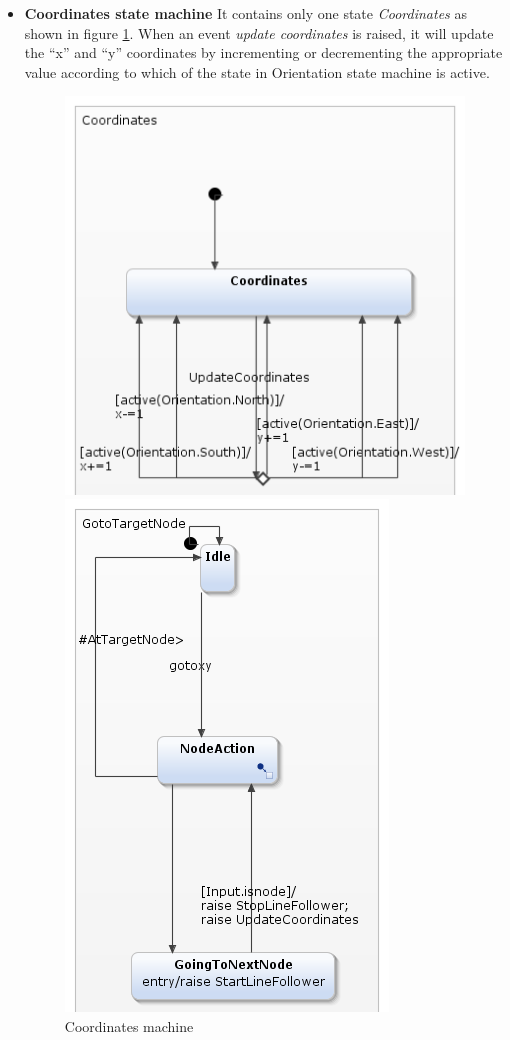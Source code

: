 \documentclass[a4paper,12pt,oneside]{book}
\begin{document}
\begin{itemize}
\item \textbf{Coordinates state machine}
It contains only one state \textit{Coordinates} as shown in figure \ref{coordinates}. When an event \textit{update coordinates} is raised, it will update the “x” and “y” coordinates by incrementing or decrementing the appropriate value according to which of the state in Orientation state machine is active.\pagebreak
	\begin{figure}[]
		\begin{minipage}{0.45\textwidth}
	\centering
	\includegraphics[scale=.6]{coordinates.png}
	\caption{Coordinates machine}
	\label{coordinates}
	\end{minipage}
\begin{minipage}{0.45\textwidth}
		\centering
	\includegraphics[scale=.6]{GoToTargetNode.png}

\end{minipage}
\end{figure}
\end{itemize}
\end{document}
